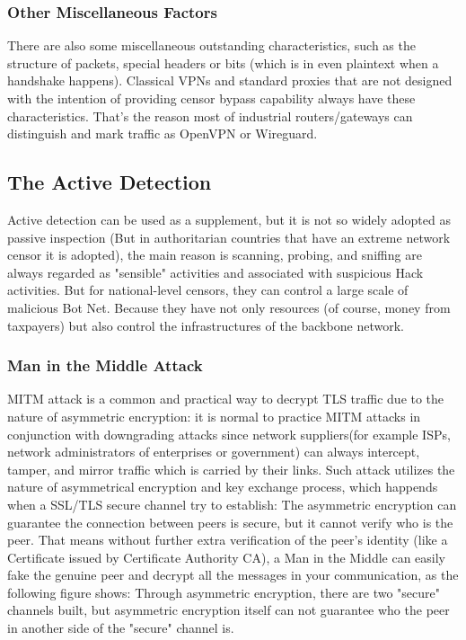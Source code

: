 \documentclass[conference]{IEEEtran}
\begin{document}

\subsubsection{Other Miscellaneous Factors}
There are also some miscellaneous outstanding characteristics, such as the structure of packets, special headers or bits (which is in even plaintext when a handshake happens). Classical VPNs and standard proxies that are not designed with the intention of providing censor bypass capability always have these characteristics. That's the reason most of industrial routers/gateways can distinguish and mark traffic as OpenVPN or Wireguard.

\subsection{The Active Detection}
Active detection can be used as a supplement, but it is not so widely adopted as passive inspection (But in authoritarian countries that have an extreme network censor it is adopted), the main reason is scanning, probing, and sniffing are always regarded as "sensible" activities and associated with suspicious Hack activities. But for national-level censors, they can control a large scale of malicious Bot Net. Because they have not only resources (of course, money from taxpayers) but also control the infrastructures of the backbone network.

\subsubsection{Man in the Middle Attack}
MITM attack is a common and practical way to decrypt TLS traffic due to the nature of asymmetric encryption:
it is normal to practice MITM attacks in conjunction with downgrading attacks since network suppliers(for example ISPs, network administrators of enterprises or government) can always intercept, tamper, and mirror traffic which is carried by their links.
Such attack utilizes the nature of asymmetrical encryption and key exchange process, which happends when a SSL/TLS secure channel try to establish: The asymmetric encryption can guarantee the connection between peers is secure, but it cannot verify who is the peer. That means without further extra verification of the peer's identity (like a Certificate issued by Certificate Authority CA), a Man in the Middle can easily fake the genuine peer and decrypt all the messages in your communication, as the following figure shows: Through asymmetric encryption, there are two "secure" channels built, but asymmetric encryption itself can not guarantee who the peer in another side of the "secure" channel is.
\end{document}
